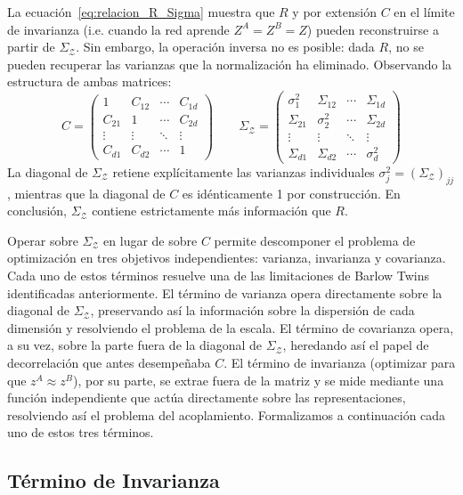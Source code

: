 La ecuación~\eqref{eq:relacion_R_Sigma} muestra que $R$ y por extensión $C$ en el límite de invarianza (i.e. cuando la red aprende $Z^A = Z^B = Z$) pueden reconstruirse a partir de $\Sigma_\mathcal{Z}$. Sin embargo, la operación inversa no es posible: dada $R$, no se pueden recuperar las varianzas que la normalización ha eliminado. Observando la estructura de ambas matrices:
\begin{equation*}
C = 
\begin{pmatrix}
1 & C_{12} & \cdots & C_{1d} \\
C_{21} & 1 & \cdots & C_{2d} \\
\vdots & \vdots & \ddots & \vdots \\
C_{d1} & C_{d2} & \cdots & 1
\end{pmatrix}
\quad  \quad
\Sigma_\mathcal{Z} = 
\begin{pmatrix}
\sigma_1^2 & \Sigma_{12} & \cdots & \Sigma_{1d} \\
\Sigma_{21} & \sigma_2^2 & \cdots & \Sigma_{2d} \\
\vdots & \vdots & \ddots & \vdots \\
\Sigma_{d1} & \Sigma_{d2} & \cdots & \sigma_d^2
\end{pmatrix}
\end{equation*}
La diagonal de $\Sigma_\mathcal{Z}$ retiene explícitamente las varianzas individuales $\sigma_j^2 = (\Sigma_\mathcal{Z})_{jj}$, mientras que la diagonal de $C$ es idénticamente 1 por construcción. En conclusión, $\Sigma_\mathcal{Z}$ contiene estrictamente más información que $R$.


Operar sobre $\Sigma_\mathcal{Z}$ en lugar de sobre $C$ permite descomponer el problema de optimización en tres objetivos independientes: varianza, invarianza y covarianza. Cada uno de estos términos resuelve una de las limitaciones de Barlow Twins identificadas anteriormente. El término de varianza opera directamente sobre la diagonal de $\Sigma_\mathcal{Z}$, preservando así la información sobre la dispersión de cada dimensión y resolviendo el problema de la escala. El término de covarianza opera, a su vez, sobre la parte fuera de la diagonal de $\Sigma_\mathcal{Z}$, heredando así el papel de decorrelación que antes desempeñaba $C$. El término de invarianza (optimizar para que $z^A \approx z^B$), por su parte, se extrae fuera de la matriz y se mide mediante una función independiente que actúa directamente sobre las representaciones, resolviendo así el problema del acoplamiento. Formalizamos a continuación cada uno de estos tres términos.
\subsection{Término de Invarianza}

